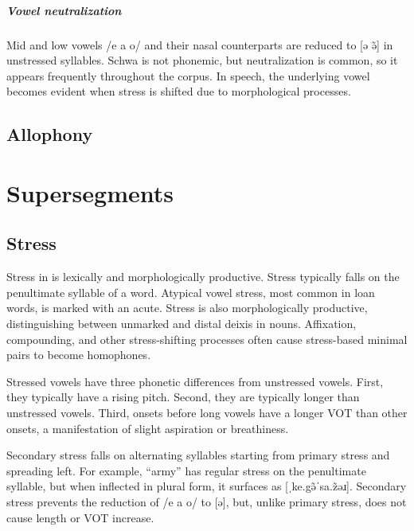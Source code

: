 \paragraph{Vowel neutralization} 
Mid and low vowels /e a o/ and their nasal counterparts are reduced to [ə ə̃] in unstressed syllables. Schwa is not phonemic, but neutralization is common, so it appears frequently throughout the corpus. In speech, the underlying vowel becomes evident when stress is shifted due to morphological processes. 

\section{Allophony}

\setchapterpreamble[u]{\margintoc}
\chapter{Supersegments}
\section{Stress}
Stress in \langname{} is lexically and morphologically productive. Stress typically falls on the penultimate syllable of a word. Atypical vowel stress, most common in loan words, is marked with an acute.  Stress is also morphologically productive, distinguishing between unmarked and distal deixis in nouns. Affixation, compounding, and other stress-shifting processes often cause stress-based minimal pairs to become homophones.

Stressed vowels have three phonetic differences from unstressed vowels. First, they typically have a rising pitch. Second, they are typically longer than unstressed vowels. Third, onsets before long vowels have a longer VOT than other onsets, a manifestation of slight aspiration or breathiness.

Secondary stress falls on alternating syllables starting from primary stress and spreading left. For example,  “army” has regular stress on the penultimate syllable, but when inflected in plural form, it surfaces as  [ˌke.gə̃ˈsa.z̃əɹ]. Secondary stress prevents the reduction of /e a o/ to [ə], but, unlike primary stress, does not cause length or VOT increase.

